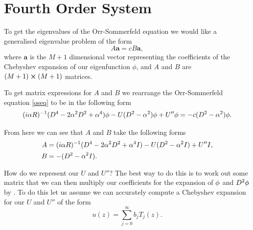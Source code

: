 \section{Fourth Order System}
To get the eigenvalues of the Orr-Sommerfeld equation we would like a generalised eigenvalue problem of the form 
\begin{equation}
    A \mathbf{a} = c B \mathbf{a},
\end{equation}
where $\mathbf{a}$ is the $ M + 1$ dimensional vector representing the coefficients of the Chebyshev expansion of our eigenfunction $ \phi$, and $ A $ and $B $ are $ (M + 1) \cross (M + 1) $ matrices.

To get matrix expressions for $A $ and $B $ we rearrange the Orr-Sommerfeld equation \eqref{oseq} to be in the following form
\begin{equation}
    (i \alpha R)^{-1} (D^4 - 2 \alpha^2 D^2 + \alpha^4) \phi - U (D^2 - \alpha^2) \phi + U'' \phi = -c (D^2 - \alpha^2) \phi. 
    \label{osrearrange}
\end{equation}

From here we can see that $ A $ and $ B $ take the following forms
\begin{align}
    A &= (i \alpha R)^{-1} (D^4 - 2 \alpha^2 D^2 + \alpha^4 I) - U (D^2 - \alpha^2 I) + U'' I, \\
    B &= -(D^2 - \alpha^2 I).
\end{align}

How do we represent our $ U $ and $ U'' $? The best way to do this is to work out some matrix that we can then multiply our coefficients for the expansion of $ \phi$ and $ D^2 \phi$ by \citep{bukhari1997spectral}. To do this let us assume we can accurately compute a Chebyshev expansion for our $ U $ and $ U''$ of the form
\begin{equation}
    u(z) = \sum^\infty_{j=0} b_j T_j(z).
\end{equation}

